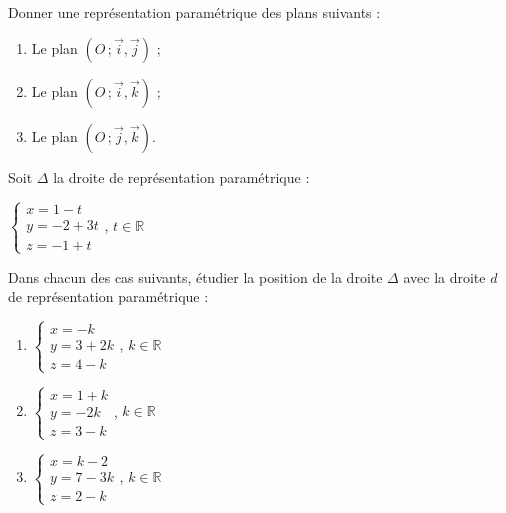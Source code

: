 \documentclass{cornouaille}
\begin{document}
\begin{exercice}
  Donner une représentation paramétrique des plans suivants :
  \begin{enumerate}
  \item Le plan $(O\,;\overrightarrow{i},\overrightarrow{j})$ ;
  \item Le plan $(O\,;\overrightarrow{i},\overrightarrow{k})$ ;
  \item Le plan $(O\,;\overrightarrow{j},\overrightarrow{k})$.
  \end{enumerate}
\end{exercice}
 
\begin{exercice}
  Soit $\Delta$ la droite de représentation paramétrique :

  \begin{center}
    $\begin{cases}x=1-t \\y=-2+3t \\z=-1+t \end{cases}$,
    $t\in\mathbb{R}$
  \end{center}

  Dans chacun des cas suivants, étudier la position de la droite
  $\Delta$ avec la droite $d$ de représentation paramétrique :
  \begin{enumerate}
  \item \begin{center}
      $\begin{cases}x=-k \\y=3+2k \\z=4-k \end{cases}$,
      $k\in\mathbb{R}$\\[3mm]
    \end{center}

  \item \begin{center}
      $\begin{cases}x=1+k \\y=-2k \\z=3-k \end{cases}$,
      $k\in\mathbb{R}$\\[3mm]
    \end{center}

  \item \begin{center}
      $\begin{cases}x=k-2 \\y=7-3k \\z=2-k \end{cases}$,
      $k\in\mathbb{R}$
    \end{center}
  \end{enumerate}
\end{exercice}
\end{document}
